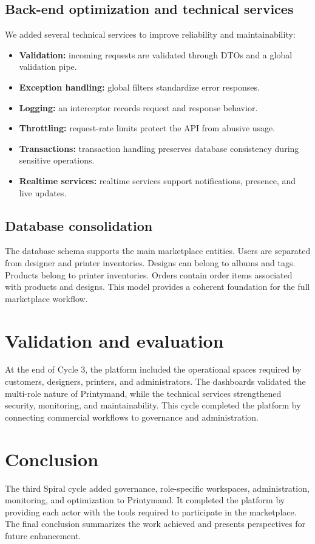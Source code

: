 
\subsection{Back-end optimization and technical services}
We added several technical services to improve reliability and maintainability:

\begin{itemize}
    \item \textbf{Validation:} incoming requests are validated through DTOs and a global validation pipe.
    \item \textbf{Exception handling:} global filters standardize error responses.
    \item \textbf{Logging:} an interceptor records request and response behavior.
    \item \textbf{Throttling:} request-rate limits protect the API from abusive usage.
    \item \textbf{Transactions:} transaction handling preserves database consistency during sensitive operations.
    \item \textbf{Realtime services:} realtime services support notifications, presence, and live updates.
\end{itemize}

\subsection{Database consolidation}
The database schema supports the main marketplace entities.
Users are separated from designer and printer inventories.
Designs can belong to albums and tags.
Products belong to printer inventories.
Orders contain order items associated with products and designs.
This model provides a coherent foundation for the full marketplace workflow.

\section{Validation and evaluation}
At the end of Cycle 3, the platform included the operational spaces required by customers, designers, printers, and administrators.
The dashboards validated the multi-role nature of Printymand, while the technical services strengthened security, monitoring, and maintainability.
This cycle completed the platform by connecting commercial workflows to governance and administration.

\section{Conclusion}
The third Spiral cycle added governance, role-specific workspaces, administration, monitoring, and optimization to Printymand.
It completed the platform by providing each actor with the tools required to participate in the marketplace.
The final conclusion summarizes the work achieved and presents perspectives for future enhancement.